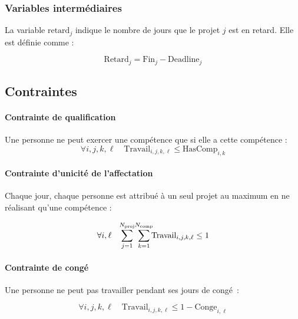 \documentclass[12pt, a4paper, english, version=last, parskip=half, titlepage]{scrartcl}
\begin{document}
\subsubsection{Variables intermédiaires}
\par La variable $\text{retard}_j$ indique le nombre de jours que le projet $j$ est en retard. Elle est définie comme :

\begin{equation*}
\text{Retard}_j = \text{Fin}_j - \text{Deadline}_j
\end{equation*}

\subsection{Contraintes}

\paragraph{Contrainte de qualification}
Une personne ne peut exercer une compétence que si elle a cette compétence :
\begin{equation*}
    \forall i, j, k, \ell \quad \text{Travail}_{i, j, k, \ell} \leq \text{HasComp}_{i, k}
\end{equation*}

\paragraph{Contrainte d’unicité de l’affectation}
Chaque jour, chaque personne est attribué à un seul projet au maximum en ne réalisant qu'une compétence :

\begin{equation*}
    \forall i, \ell \quad \sum_{j=1}^{\mathclap{N_{\text{proj}}}} \hspace{1ex} \sum_{k=1}^{\mathclap{N_{\text{comp}}}} \text{Travail}_{i, j, k, \ell} \leq 1
\end{equation*}

\paragraph{Contrainte de congé}
Une personne ne peut pas travailler pendant ses jours de congé~:

\begin{equation*}
    \forall i, j, k, \ell \quad \text{Travail}_{i,j,k,\ell} \le 1 - \text{Conge}_{i,\ell}
\end{equation*}
\end{document}
